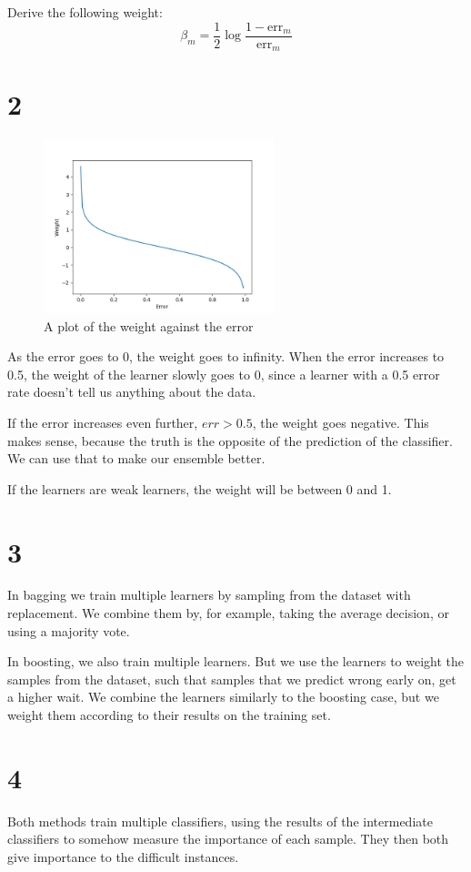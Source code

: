 \documentclass[11pt]{article}
\begin{document}
Derive the following weight:
\[
	\beta_m = \frac{1}{2} \log \frac{1-\text{err}_m}{\text{err}_m}
\]

\section*{2}

\begin{figure}[h]
	\centering
	\includegraphics[width=0.6\textwidth]{images/ex2_2}
	\caption{A plot of the weight against the error}
\end{figure}
As the error goes to 0, the weight goes to infinity. When the error increases to 0.5, the weight of the learner slowly goes to 0, since a learner with a 0.5 error rate doesn't tell us anything about the data. 

If the error increases even further, $err>0.5$, the weight goes negative. This makes sense, because the truth is the opposite of the prediction of the classifier. We can use that to make our ensemble better.

If the learners are weak learners, the weight will be between 0 and 1.

\section*{3}

In bagging we train multiple learners by sampling from the dataset with replacement. We combine them by, for example, taking the average decision, or using a majority vote.

In boosting, we also train multiple learners. But we use the learners to weight the samples from the dataset, such that samples that we predict wrong early on, get a higher wait. We combine the learners similarly to the boosting case, but we weight them according to their results on the training set.

\section*{4}
Both methods train multiple classifiers, using the results of the intermediate classifiers to somehow measure the importance of each sample. They then both give importance to the difficult instances.
\end{document}
